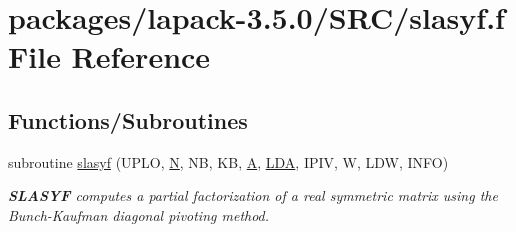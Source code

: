 \hypertarget{slasyf_8f}{}\section{packages/lapack-\/3.5.0/\+S\+R\+C/slasyf.f File Reference}
\label{slasyf_8f}
\subsection*{Functions/\+Subroutines}
\begin{DoxyCompactItemize}
\item 
subroutine \hyperlink{group__realSYcomputational_ga409610d6bc329d424d5a8a1d2640c445}{slasyf} (U\+P\+L\+O, \hyperlink{polmisc_8c_a0240ac851181b84ac374872dc5434ee4}{N}, N\+B, K\+B, \hyperlink{classA}{A}, \hyperlink{example__user_8c_ae946da542ce0db94dced19b2ecefd1aa}{L\+D\+A}, I\+P\+I\+V, W, L\+D\+W, I\+N\+F\+O)
\begin{DoxyCompactList}\small\item\em {\bfseries S\+L\+A\+S\+Y\+F} computes a partial factorization of a real symmetric matrix using the Bunch-\/\+Kaufman diagonal pivoting method. \end{DoxyCompactList}\end{DoxyCompactItemize}
